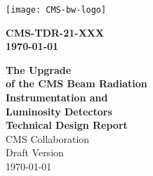 \thispagestyle{empty} \vspace*{-15mm}

\texttt{[image: CMS-bw-logo]}


\vspace*{-25mm}


{\large\sffamily
\hspace*{\fill}\parbox{55mm}%
{%
{\sffamily\bfseries {CMS-TDR-21-XXX}}                   \\[2mm]
{\sffamily\bfseries {\today}       \\[2mm]
}
}
}

\vspace{3cm}

\begin{center}

{\sffamily\bfseries \Huge The \phasetwo Upgrade}\\[15mm]
{\sffamily\bfseries \Huge of the CMS Beam Radiation}\\[15mm]
{\sffamily\bfseries \Huge Instrumentation and}\\[15mm]
{\sffamily\bfseries \Huge Luminosity Detectors}\\[15mm]
{\sffamily\bfseries \huge Technical Design Report}\\[30mm]
{\sffamily \huge CMS Collaboration}\\[10mm]
{\sffamily \large Draft Version}\\[10mm]
{\sffamily \large \today}\\[10mm]

\end{center}

\vspace*{\fill}
\clearpage